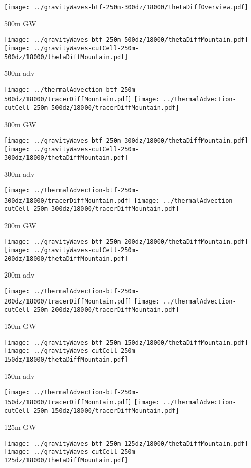 \documentclass{article}
\begin{document}
\centering
\texttt{[image: ../gravityWaves-btf-250m-300dz/18000/thetaDiffOverview.pdf]}
\vspace*{0.1in}

\newpage
500m GW

\texttt{[image: ../gravityWaves-btf-250m-500dz/18000/thetaDiffMountain.pdf]}
\texttt{[image: ../gravityWaves-cutCell-250m-500dz/18000/thetaDiffMountain.pdf]}

500m adv

\texttt{[image: ../thermalAdvection-btf-250m-500dz/18000/tracerDiffMountain.pdf]}
\texttt{[image: ../thermalAdvection-cutCell-250m-500dz/18000/tracerDiffMountain.pdf]}

\newpage
300m GW

\texttt{[image: ../gravityWaves-btf-250m-300dz/18000/thetaDiffMountain.pdf]}
\texttt{[image: ../gravityWaves-cutCell-250m-300dz/18000/thetaDiffMountain.pdf]}

300m adv

\texttt{[image: ../thermalAdvection-btf-250m-300dz/18000/tracerDiffMountain.pdf]}
\texttt{[image: ../thermalAdvection-cutCell-250m-300dz/18000/tracerDiffMountain.pdf]}

\newpage
200m GW

\texttt{[image: ../gravityWaves-btf-250m-200dz/18000/thetaDiffMountain.pdf]}
\texttt{[image: ../gravityWaves-cutCell-250m-200dz/18000/thetaDiffMountain.pdf]}

200m adv

\texttt{[image: ../thermalAdvection-btf-250m-200dz/18000/tracerDiffMountain.pdf]}
\texttt{[image: ../thermalAdvection-cutCell-250m-200dz/18000/tracerDiffMountain.pdf]}

\newpage
150m GW

\texttt{[image: ../gravityWaves-btf-250m-150dz/18000/thetaDiffMountain.pdf]}
\texttt{[image: ../gravityWaves-cutCell-250m-150dz/18000/thetaDiffMountain.pdf]}

150m adv

\texttt{[image: ../thermalAdvection-btf-250m-150dz/18000/tracerDiffMountain.pdf]}
\texttt{[image: ../thermalAdvection-cutCell-250m-150dz/18000/tracerDiffMountain.pdf]}

\newpage

125m GW

\texttt{[image: ../gravityWaves-btf-250m-125dz/18000/thetaDiffMountain.pdf]}
\texttt{[image: ../gravityWaves-cutCell-250m-125dz/18000/thetaDiffMountain.pdf]}
\end{document}
